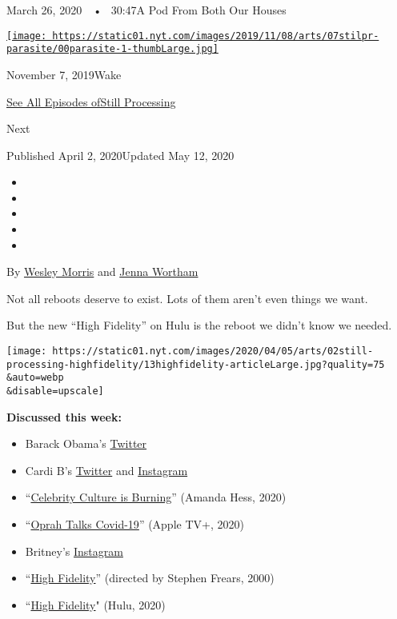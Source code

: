 March 26, 2020~~•~ 30:47A Pod From Both Our Houses

\href{https://www.nytimes.com/2019/11/07/podcasts/still-processing-parasite-watchmen-bong-joon-ho.html?action=click\&module=audio-series-bar\&region=header\&pgtype=Article}{\texttt{[image: https://static01.nyt.com/images/2019/11/08/arts/07stilpr-parasite/00parasite-1-thumbLarge.jpg]}}

November 7, 2019Wake

\href{https://www.nytimes.com/column/still-processing-podcast}{See All
Episodes ofStill Processing}

Next

Published April 2, 2020Updated May 12, 2020

\begin{itemize}
\item
\item
\item
\item
\item
\end{itemize}

By \href{https://www.nytimes.com/by/wesley-morris}{Wesley Morris} and
\href{https://www.nytimes.com/by/jenna-wortham}{Jenna Wortham}

Not all reboots deserve to exist. Lots of them aren't even things we
want.

But the new ``High Fidelity'' on Hulu is the reboot we didn't know we
needed.

\texttt{[image: https://static01.nyt.com/images/2020/04/05/arts/02still-processing-highfidelity/13highfidelity-articleLarge.jpg?quality=75\\\&auto=webp\\\&disable=upscale]}

\textbf{Discussed this week:}

\begin{itemize}
\item
  Barack Obama's \href{https://twitter.com/BarackObama}{Twitter}
\item
  Cardi B's \href{https://twitter.com/iamcardib}{Twitter} and
  \href{https://www.instagram.com/iamcardib/}{Instagram}
\item
  ``\href{https://www.nytimes.com/2020/03/30/arts/virus-celebrities.html}{Celebrity
  Culture is Burning}'' (Amanda Hess, 2020)
\item
  ``\href{https://tv.apple.com/us/show/oprah-talks-covid-19/umc.cmc.1xr8rwhaw9pkks7bvzy44dezt}{Oprah
  Talks Covid-19}'' (Apple TV+, 2020)
\item
  Britney's \href{https://www.instagram.com/p/B-FppKxAFxm/}{Instagram}
\item
  ``\href{https://www.imdb.com/title/tt0146882/}{High Fidelity}''
  (directed by Stephen Frears, 2000)
\item
  ``\href{https://www.hulu.com/series/high-fidelity-52cb09be-ccc9-4eb4-9db8-f00b0443b2f5}{High
  Fidelity}" (Hulu, 2020)
\end{itemize}

